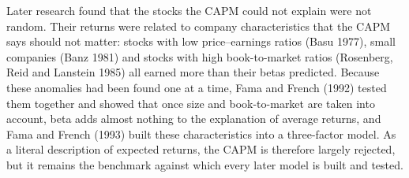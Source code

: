 Later research found that the stocks the CAPM could not explain were not random. Their returns were related to company characteristics that the CAPM says should not matter: stocks with low price--earnings ratios (Basu 1977), small companies (Banz 1981) and stocks with high book-to-market ratios (Rosenberg, Reid and Lanstein 1985) all earned more than their betas predicted. Because these anomalies had been found one at a time, Fama and French (1992) tested them together and showed that once size and book-to-market are taken into account, beta adds almost nothing to the explanation of average returns, and Fama and French (1993) built these characteristics into a three-factor model. As a literal description of expected returns, the CAPM is therefore largely rejected, but it remains the benchmark against which every later model is built and tested.


